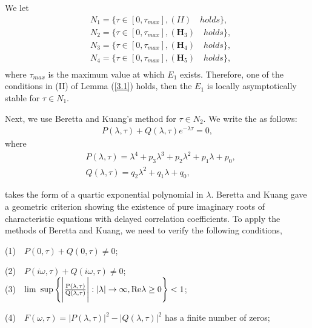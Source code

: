 \documentclass{CMHPhD-SIVD}
\begin{document}
We let
\begin{align*}
&N_1=\{\tau\in[0, \tau_{max}], (II) \quad holds\}, \\
&N_2=\{\tau\in[0, \tau_{max}], (\mathbf{H}_3) \quad holds\}, \\
&N_3=\{\tau\in[0, \tau_{max}], (\mathbf{H}_4) \quad holds\}, \\
&N_4=\{\tau\in[0, \tau_{max}], (\mathbf{H}_5) \quad holds\}, \\
\end{align*}
where $\tau_{max}$ is the maximum value at which $E_1$ exists. Therefore, one of the conditions in (II) of Lemma (\ref{3.1}) holds, then
the $E_1$ is locally asymptotically stable for $\tau\in N_1$.


Next, we use Beretta and Kuang's \cite{beretta2002geometric} method for $\tau\in N_2$. We write the   as follows:
\begin{equation}\label{13}
   \begin{array}{ll}
   P(\lambda,\tau)+Q(\lambda,\tau)e^{-\lambda \tau}=0,
   \end{array}
\end{equation}
where
\begin{equation}\label{14}
\begin{array}{ll}
   &P(\lambda,\tau)=\lambda^4+p_3 \lambda^3+p_2 \lambda^2+p_1 \lambda+p_0,\\
   &Q(\lambda,\tau)=q_2 \lambda^2+q_1 \lambda+q_0,
   \end{array}
\end{equation}


 takes the form of a quartic exponential polynomial in $\lambda$. Beretta and Kuang gave a geometric criterion showing the existence of pure imaginary roots of characteristic equations with delayed correlation coefficients. To apply the methods of Beretta and Kuang, we need to verify the following conditions,

(1)$\quad P(0,\tau)+Q(0,\tau)\neq0$;

(2)$\quad P(i \omega,\tau)+Q(i\omega,\tau)\neq0$;\\

(3)$\quad \rm lim$ $\rm sup\left\{\Bigg|\frac{P(\lambda,\tau)}{Q(\lambda,\tau)}\Bigg|:|\lambda|\rightarrow\infty, Re \lambda\geq0\right \}<1$;

(4)$\quad F(\omega,\tau)=|P(\lambda,\tau)|^2-|Q(\lambda,\tau)|^2$ has a finite number of zeros;\\
\end{document}
